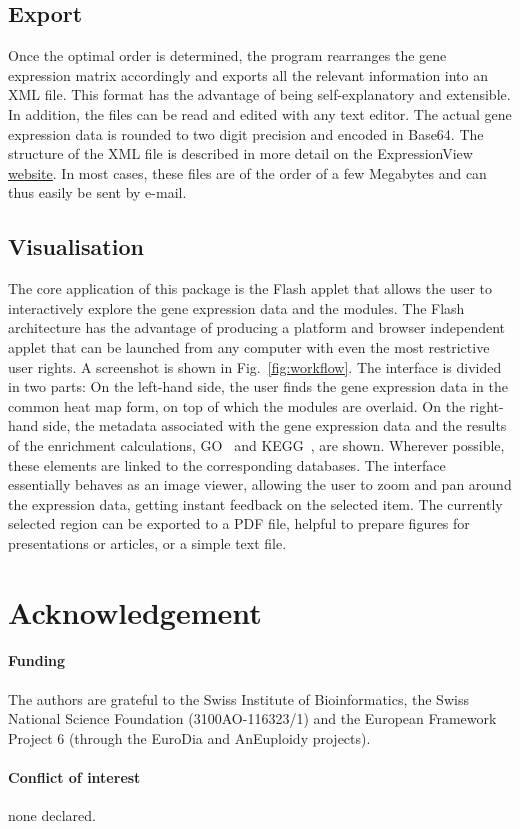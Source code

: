 \documentclass[round]{bioinfo}
\begin{document}
\subsection{Export}
Once the optimal order is determined, the program rearranges the gene
expression matrix accordingly and exports all the relevant information
into an XML file. This format has the advantage of being
self-explanatory and extensible. In addition, the files can be read
and edited with any text editor. The actual gene expression data is
rounded to two digit precision and encoded in Base64. The structure of
the XML file is described in more detail on the ExpressionView
\href{http://www.unil.ch/cbg/ExpressionView}{website}. In most cases,
these files are of the order of a few Megabytes and can thus easily be
sent by e-mail.

\subsection{Visualisation}
The core application of this package is the Flash applet that allows
the user to interactively explore the gene expression data and the
modules. The Flash architecture has the advantage of
producing a platform and browser independent applet that can be
launched from any computer with even the most restrictive user
rights. A screenshot is shown in Fig.~\ref{fig:workflow}. The
interface is divided in two parts: On the left-hand side, the user
finds the gene expression data in the common heat map form, on top of
which the modules are overlaid. On the right-hand side, the metadata
associated with the gene expression data and the results of the
enrichment calculations, GO~\citep{ashburner00} and
KEGG~\citep{kanehisa04}, are shown. Wherever possible, these elements
are linked to the corresponding databases. The interface essentially
behaves as an image viewer, allowing the user to zoom and pan around
the expression data, getting instant feedback on the selected
item. The currently selected region can be exported to a PDF file,
helpful to prepare figures for presentations or articles, or a simple
text file.

\vspace*{-7pt}
\section*{Acknowledgement}

\paragraph{Funding\textcolon} The authors are grateful to the Swiss
Institute of Bioinformatics, the Swiss National Science Foundation
(3100AO-116323/1) and the European Framework Project 6 (through
the EuroDia and AnEuploidy projects).

\paragraph{Conflict of interest\textcolon} none declared.

\vspace*{-7pt}


\end{document}

